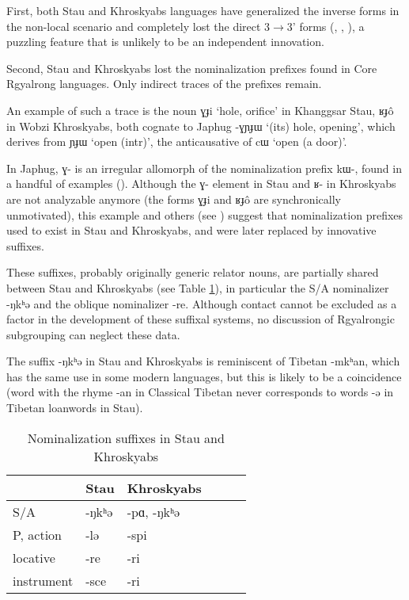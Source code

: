 \documentclass[oneside,a4paper,11pt]{article}
\newcommand{\ipa}[1]{{\phon #1}} %
\begin{document}
 First, both Stau and Khroskyabs languages have generalized the inverse forms in the non-local scenario and completely lost the direct 3$\rightarrow$3' forms (\citealt{lai13affixale}, \citealt{jacques14inverse},   \citealt{lai14person}), a puzzling feature that is unlikely to be an independent innovation.
 
 Second, Stau and Khroskyabs lost the nominalization prefixes found in Core Rgyalrong languages. Only indirect traces of the prefixes remain.
 
 An example of such a trace is the noun \ipa{ɣɟi}  `hole, orifice' in Khanggsar Stau,  \ipa{ʁɟô} in Wobzi Khroskyabs, both   cognate to Japhug \ipa{-ɣɲɟɯ}  `(its) hole, opening', which  derives from \ipa{ɲɟɯ} `open (intr)', the anticausative of \ipa{cɯ} `open (a door)'. 
 
 In Japhug, \ipa{ɣ-} is an irregular allomorph of the nominalization prefix \ipa{kɯ-}, found in a handful of examples (\citealt[4-6]{jacques14antipassive}). Although the \ipa{ɣ-} element in Stau and \ipa{ʁ-} in Khroskyabs are not analyzable anymore (the forms \ipa{ɣɟi}  and   \ipa{ʁɟô} are synchronically unmotivated), this example and others (see \citealt[1228-9]{jacques12incorp}) suggest  that nominalization prefixes used to exist in Stau and Khroskyabs, and were later replaced by innovative suffixes.  
 
 These suffixes, probably originally generic relator nouns, are partially shared between Stau and Khroskyabs (see Table \ref{tab:nmlz}), in particular the S/A nominalizer \ipa{-ŋkʰə} and the oblique nominalizer \ipa{-re}. Although contact cannot be excluded as a factor in the development of these suffixal systems, no discussion of Rgyalrongic subgrouping can neglect these data. 
 
 The suffix \ipa{-ŋkʰə}  in Stau and Khroskyabs is reminiscent of Tibetan \ipa{-mkʰan}, which has the same use in some modern languages, but this is likely to be a coincidence (word with the rhyme \ipa{-an} in Classical Tibetan never corresponds to words \ipa{-ə} in Tibetan loanwords in Stau).
 
 
 
 
  \begin{table}[h]
  \caption{Nominalization suffixes in Stau and Khroskyabs} \label{tab:nmlz} \centering
 \begin{tabular}{llllll}
 \toprule
 &	Stau &	Khroskyabs &	\\	
 \midrule
S/A &	\ipa{-ŋkʰə} &	\ipa{-pɑ, -ŋkʰə} &	\\
P, action &	\ipa{-lə} &	\ipa{-spi} &	\\
locative &	\ipa{-re} &	\ipa{-ri} &	\\
instrument &	\ipa{-sce} &	\ipa{-ri} &	\\
\bottomrule
\end{tabular}
\end{table}
\end{document}
